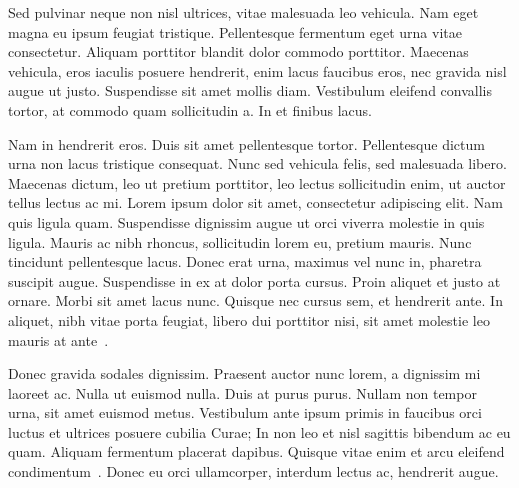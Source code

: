 Sed pulvinar neque non nisl ultrices, vitae malesuada leo vehicula. Nam eget magna eu ipsum feugiat tristique. Pellentesque fermentum eget urna vitae consectetur. Aliquam porttitor blandit dolor commodo porttitor. Maecenas vehicula, eros iaculis posuere hendrerit, enim lacus faucibus eros, nec gravida nisl augue ut justo. Suspendisse sit amet mollis diam. Vestibulum eleifend convallis tortor, at commodo quam sollicitudin a. In et finibus lacus.

Nam in hendrerit eros. Duis sit amet pellentesque tortor. Pellentesque dictum urna non lacus tristique consequat. Nunc sed vehicula felis, sed malesuada libero. Maecenas dictum, leo ut pretium porttitor, leo lectus sollicitudin enim, ut auctor tellus lectus ac mi. Lorem ipsum dolor sit amet, consectetur adipiscing elit. Nam quis ligula quam. Suspendisse dignissim augue ut orci viverra molestie in quis ligula. Mauris ac nibh rhoncus, sollicitudin lorem eu, pretium mauris. Nunc tincidunt pellentesque lacus. Donec erat urna, maximus vel nunc in, pharetra suscipit augue. Suspendisse in ex at dolor porta cursus. Proin aliquet et justo at ornare. Morbi sit amet lacus nunc. Quisque nec cursus sem, et hendrerit ante. In aliquet, nibh vitae porta feugiat, libero dui porttitor nisi, sit amet molestie leo mauris at ante~\cite{Shupkii}.

Donec gravida sodales dignissim. Praesent auctor nunc lorem, a dignissim mi laoreet ac. Nulla ut euismod nulla. Duis at purus purus. Nullam non tempor urna, sit amet euismod metus. Vestibulum ante ipsum primis in faucibus orci luctus et ultrices posuere cubilia Curae; In non leo et nisl sagittis bibendum ac eu quam. Aliquam fermentum placerat dapibus. Quisque vitae enim et arcu eleifend condimentum~\cite{QuickGraph_Codeplex}. Donec eu orci ullamcorper, interdum lectus ac, hendrerit augue.